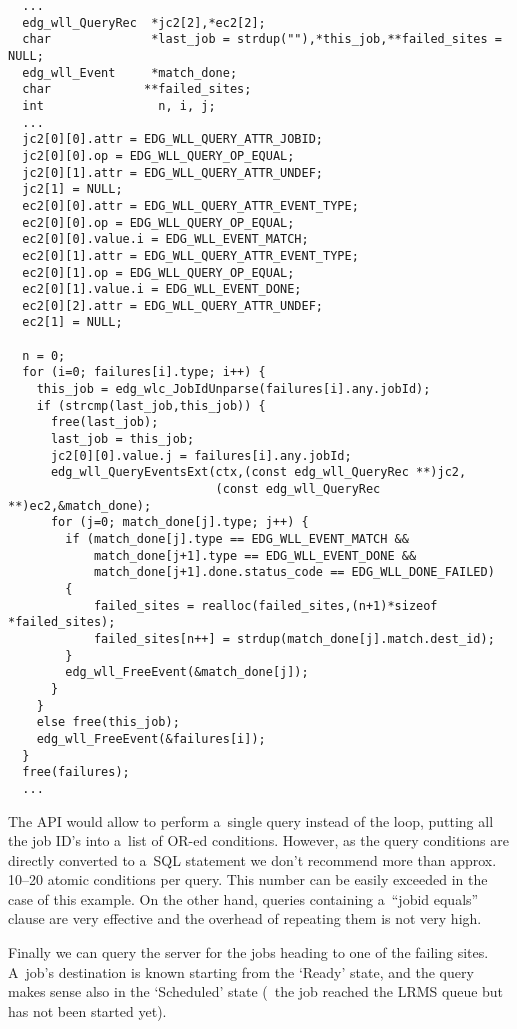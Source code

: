 \begin{verbatim}
  ...
  edg_wll_QueryRec  *jc2[2],*ec2[2];
  char              *last_job = strdup(""),*this_job,**failed_sites = NULL;
  edg_wll_Event     *match_done;
  char             **failed_sites;
  int                n, i, j;
  ...
  jc2[0][0].attr = EDG_WLL_QUERY_ATTR_JOBID;
  jc2[0][0].op = EDG_WLL_QUERY_OP_EQUAL;
  jc2[0][1].attr = EDG_WLL_QUERY_ATTR_UNDEF;
  jc2[1] = NULL;
  ec2[0][0].attr = EDG_WLL_QUERY_ATTR_EVENT_TYPE;
  ec2[0][0].op = EDG_WLL_QUERY_OP_EQUAL;
  ec2[0][0].value.i = EDG_WLL_EVENT_MATCH;
  ec2[0][1].attr = EDG_WLL_QUERY_ATTR_EVENT_TYPE;
  ec2[0][1].op = EDG_WLL_QUERY_OP_EQUAL;
  ec2[0][1].value.i = EDG_WLL_EVENT_DONE;
  ec2[0][2].attr = EDG_WLL_QUERY_ATTR_UNDEF;
  ec2[1] = NULL;
  
  n = 0;
  for (i=0; failures[i].type; i++) {
    this_job = edg_wlc_JobIdUnparse(failures[i].any.jobId);
    if (strcmp(last_job,this_job)) {
      free(last_job);
      last_job = this_job;
      jc2[0][0].value.j = failures[i].any.jobId;
      edg_wll_QueryEventsExt(ctx,(const edg_wll_QueryRec **)jc2,
                             (const edg_wll_QueryRec **)ec2,&match_done);
      for (j=0; match_done[j].type; j++) {
        if (match_done[j].type == EDG_WLL_EVENT_MATCH &&
            match_done[j+1].type == EDG_WLL_EVENT_DONE &&
            match_done[j+1].done.status_code == EDG_WLL_DONE_FAILED)
        {
            failed_sites = realloc(failed_sites,(n+1)*sizeof *failed_sites);
            failed_sites[n++] = strdup(match_done[j].match.dest_id);
        }
        edg_wll_FreeEvent(&match_done[j]);
      }
    }
    else free(this_job);
    edg_wll_FreeEvent(&failures[i]);
  }
  free(failures);
  ...
\end{verbatim}

The API would allow to perform a~single query instead of the loop,
putting all the job ID's into a~list of OR-ed conditions.
However, as the query conditions are directly converted to a~SQL statement
we don't recommend more than approx. 10--20 atomic conditions per query.
This number can be easily exceeded in the case of this example.
On the other hand, queries containing a~``jobid equals'' clause are very
effective and the overhead of repeating them is not very high.

Finally we can query the server for the jobs heading to one of the failing
sites.
A~job's destination is known starting from the `Ready' state,
and the query makes sense also in the `Scheduled' state (\ie\ the job reached
the LRMS queue but has not been started yet). 

